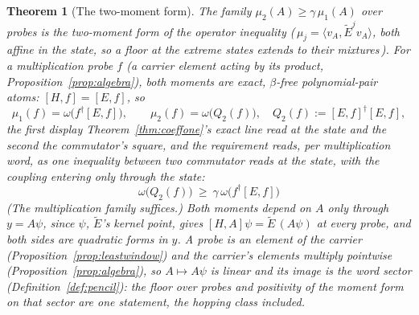\documentclass[11pt]{article}
\newtheorem{theorem}{Theorem}
\theoremstyle{definition}
\begin{document}
\begin{theorem}[The two-moment form]\label{thm:momentform}
The family $\mu_2(A)\ge\gamma\,\mu_1(A)$ over probes is the
two-moment form of the operator inequality
(\,$\mu_j=\langle v_A,\tilde E^jv_A\rangle$, both affine in
the state, so a floor at the extreme states extends to their
mixtures\,). For a
\emph{multiplication} probe $f$ (a carrier element acting by its product,
Proposition~\ref{prop:algebra}),
both moments are \emph{exact, $\beta$-free polynomial-pair atoms}:
$[H,f]=[E,f]$, so
\[
\mu_1(f)=\omega\big(f^\dagger[E,f]\big),\qquad
\mu_2(f)=\omega\big(Q_2(f)\big),\quad
Q_2(f):=[E,f]^\dagger[E,f],
\]
the first display Theorem~\ref{thm:coeffone}'s exact line read at
the state and the second the commutator's square, and the
requirement reads, per multiplication word, as one inequality
between two commutator reads at the state, with the
coupling entering \emph{only} through the state:
\[
\boxed{\ \omega\big(Q_2(f)\big)\ \ge\ \gamma\,
\omega\big(f^\dagger[E,f]\big)\ }
\] \emph{(The multiplication family suffices.)} Both moments depend on
$A$ only through $y=A\psi$, since $\psi$, $\tilde E$'s kernel point, gives
$[H,A]\psi=\tilde E\,(A\psi)$ at every probe, and both sides are quadratic
forms in $y$. A probe is an element of the carrier
(Proposition~\ref{prop:leastwindow}) and the carrier's elements multiply
pointwise (Proposition~\ref{prop:algebra}), so $A\mapsto A\psi$ is linear and
its image is the word sector (Definition~\ref{def:pencil}): the floor over
probes and positivity of the moment form on that sector are one statement, the
hopping class included.


\end{theorem}
\end{document}
